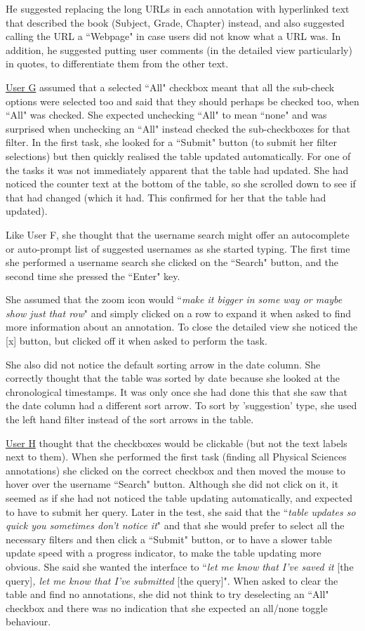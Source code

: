 He suggested replacing the long URLs in each annotation with hyperlinked text that described the book (Subject, Grade, Chapter) instead, and also suggested calling the URL a ``Webpage" in case users did not know what a URL was. In addition, he suggested putting user comments (in the detailed view particularly) in quotes, to differentiate them from the other text.  

\underline{User G} assumed that a selected ``All" checkbox meant that all the sub-check options were selected too and said that they should perhaps be checked too, when ``All" was checked.  She expected unchecking ``All" to mean ``none" and was surprised when unchecking an ``All" instead checked the sub-checkboxes for that filter. In the first task, she looked for a ``Submit" button (to submit her filter selections) but then quickly realised the table updated automatically. For one of the tasks it was not immediately apparent that the table had updated. She had noticed the counter text at the bottom of the table, so she scrolled down to see if that had changed (which it had. This confirmed for her that the table had updated). 

Like User F, she thought that the username search might offer an autocomplete or auto-prompt list of suggested usernames as she started typing. The first time she performed a username search she clicked on the ``Search" button, and the second time she pressed the ``Enter" key. 

She assumed that the zoom icon would ``\textit{make it bigger in some way or maybe show just that row}" and simply clicked on a row to expand it when asked to find more information about an annotation. To close the detailed view she noticed the [x] button, but clicked off it when asked to perform the task. 

She also did not notice the default sorting arrow in the date column. She correctly thought that the table was sorted by date because she looked at the chronological timestamps. It was only once she had done this that she saw that the date column had a different sort arrow. To sort by 'suggestion' type, she used the left hand filter instead of the sort arrows in the table. 

\underline{User H} thought that the checkboxes would be clickable (but not the text labels next to them). When she performed the first task (finding all Physical Sciences annotations) she clicked on the correct checkbox and then moved the mouse to hover over the username ``Search" button. Although she did not click on it, it seemed as if she had not noticed the table updating automatically, and expected to have to submit her query. Later in the test, she said that the ``\textit{table updates so quick you sometimes don't notice it}" and that she would prefer to select all the necessary filters and then click a ``Submit" button, or to have a slower table update speed with a progress indicator, to make the table updating more obvious. She said she wanted the interface to ``\textit{let me know that I've saved it} [the query]\textit{, let me know that I've submitted} [the query]". When asked to clear the table and find no annotations, she did not think to try deselecting an ``All" checkbox and there was no indication that she expected an all/none toggle behaviour.

